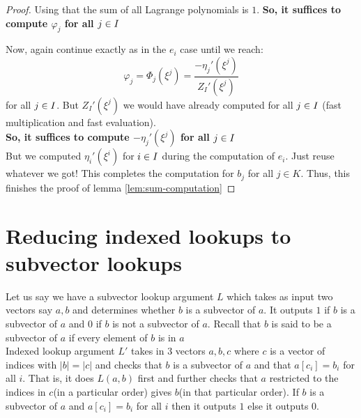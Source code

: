 \begin{proof}
    Using that the sum of all Lagrange polynomials is $1$. \textbf{So, it suffices to compute $\varphi_j$ for all $j \in I$}

    Now, again continue exactly as in the $e_i$ case until we reach:
    $$\varphi_j =\Phi_j(\xi^j) = \frac{-\eta_j'(\xi^j)}{Z_I'(\xi^j)}$$
    for all $j \in I$. But $Z_I'(\xi^j)$ we would have already computed for all $j \in I$ (fast multiplication and fast evaluation). \\
    \textbf{So, it suffices to compute $-\eta_j'(\xi^j)$ for all $j \in I$\\}
    But we computed $\eta_i'(\xi^i)$ for $i\in I$ during the computation of $e_i$. Just reuse whatever we got!
    This completes the computation for $b_j$ for all $j \in K$.
    Thus, this finishes the proof of lemma \ref{lem:sum-computation}
\end{proof}

\section{Reducing indexed lookups to subvector lookups}\label{sec:generic-transformation-app}
Let us say we have a subvector lookup argument $L$ which takes as input two vectors say $a, b$ and determines whether $b$ is a subvector of $a$. It outputs $1$ if $b$ is a subvector of $a$ and $0$ if $b$ is not a subvector of $a$.
Recall that $b$ is said to be a subvector of $a$ if every element of $b$ is in $a$\\
Indexed lookup argument $L'$ takes in 3 vectors $a, b, c$ where $c$ is a vector of indices with $|b|=|c|$ and checks that $b$ is a subvector of $a$ and that $a[c_i]=b_i$ for all $i$. That is, it does $L(a, b)$ first and further checks that $a$ restricted to the indices in $c$(in a particular order) gives $b$(in that particular order).
If $b$ is a subvector of $a$ and $a[c_i]=b_i$ for all $i$ then it outputs $1$ else it outputs $0$.\\

